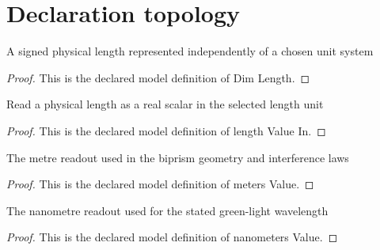\section{Declaration topology}
\begin{definition}
  \label{def:physics:phyx-mini-0121:phyxminiproblems-problemphyxmini0121-dimlength}
  A signed physical length represented independently of a chosen unit system
\end{definition}
\begin{proof}
  This is the declared model definition of Dim Length.
\end{proof}
\begin{definition}
  \label{def:physics:phyx-mini-0121:phyxminiproblems-problemphyxmini0121-lengthvaluein}
  Read a physical length as a real scalar in the selected length unit
\end{definition}
\begin{proof}
  This is the declared model definition of length Value In.
\end{proof}
\begin{definition}
  \label{def:physics:phyx-mini-0121:phyxminiproblems-problemphyxmini0121-metersvalue}
  The metre readout used in the biprism geometry and interference laws
\end{definition}
\begin{proof}
  This is the declared model definition of meters Value.
\end{proof}
\begin{definition}
  \label{def:physics:phyx-mini-0121:phyxminiproblems-problemphyxmini0121-nanometersvalue}
  The nanometre readout used for the stated green-light wavelength
\end{definition}
\begin{proof}
  This is the declared model definition of nanometers Value.
\end{proof}
